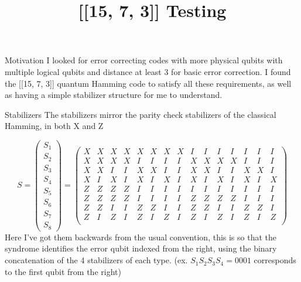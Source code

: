 \documentclass{beamer}
\title{[[15, 7, 3]] Testing}
\begin{document}
\maketitle

\begin{frame}{Motivation}
    I looked for error correcting codes with more physical qubits with multiple logical qubits and distance at least 3 for basic error correction. I found the [[15, 7, 3]] quantum Hamming code to satisfy all these requirements, as well as having a simple stabilizer structure for me to understand. 
\end{frame}

\begin{frame}{Stabilizers}
    The stabilizers mirror the parity check stabilizers of the classical Hamming, in both X and Z
    \footnotesize

    \[
    S = 
    \begin{pmatrix}
    S_1 \\ S_2 \\ S_3 \\ S_4 \\ S_5 \\ S_6 \\ S_7 \\ S_8
    \end{pmatrix}
    =
    \begin{pmatrix}
        X & X & X & X & X & X & X & X & I & I & I & I & I & I & I \\
        X & X & X & X & I & I & I & I & X & X & X & X & I & I & I \\
        X & X & I & I & X & X & I & I & X & X & I & I & X & X & I \\
        X & I & X & I & X & I & X & I & X & I & X & I & X & I & X \\
        Z & Z & Z & Z & I & I & I & I & I & I & I & I & I & I & I \\
        Z & Z & Z & Z & I & I & I & I & Z & Z & Z & Z & I & I & I \\
        Z & Z & I & I & Z & Z & I & I & Z & Z & I & I & Z & Z & I \\
        Z & I & Z & I & Z & I & Z & I & Z & I & Z & I & Z & I & Z \\
    \end{pmatrix}
    \]
    \normalsize
    Here I've got them backwards from the usual convention, this is so that the syndrome identifies the error qubit indexed from the right, using the binary concatenation of the 4 stabilizers of each type. (ex. $S_1S_2S_3S_4 = 0001$ corresponds to the first qubit from the right)
\end{frame}
\end{document}
